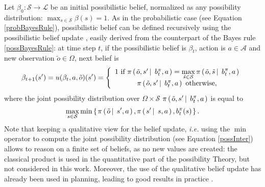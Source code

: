 {Let $\beta_0: \mathcal{S} \rightarrow \mathcal{L}$ be an initial possibilistic belief,
normalized as any possibility distribution: $\max_{s \in \mathcal{S}} \beta(s)=1$.
As in the probabilistic case (see Equation \ref{probBayesRule}), possibilistic belief can be defined recursively
using the possibilistic belief update \cite{Drougard13}, easily derived from the counterpart of the
Bayes rule \ref{possBayesRule}: at time step $t$, 
if the possibilistic belief is $\beta_t$, action is $a \in \mathcal{A}$ 
and new observation $\tilde{o} \in \Omega$, next belief is
\begin{eqnarray}
\label{possBelUpdate} \beta_{t+1}(s') = u(\beta_{t},a,\tilde{o})(s') =  \left \{ \begin{array}{ccc} 1 \mbox{ if } \pi \left( \left.  \tilde{o},s' \, \right| \left. \, b_t^{\pi}, a \right. \right) = \displaystyle \max_{\tilde{s} \in \mathcal{S}} \pi \left( \left.  \tilde{o}, \tilde{s} \, \right| \left. \, b_t^{\pi}, a \right. \right) \\
 \pi \left( \left.  \tilde{o}, s' \, \right| \left. \, b_t^{\pi}, a \right. \right) \mbox{ otherwise},
\end{array} \right.
\end{eqnarray}
where the joint possibility distribution over $\Omega \times \mathcal{S}$
$\pi \left( \left.  \tilde{o},s' \, \right| \left. \, b_t^{\pi}, a \right. \right)$ is equal to \[ \max_{s \in \mathcal{S}} \min \left\{ \left.  \pi \left( \left.  \tilde{o} \, \right| \left. \, s',a  \right. \right), \pi \left( \left.  s' \, \right| \left. \, s,a  \right. \right), b_t^{\pi}(s) \right. \right\}.\]
Note that keeping a qualitative view for the belief update,
\textit{i.e.} using the $\min$ operator 
to compute the joint possibility distribution (see Equation \ref{possInter})
allows to reason on a finite set of beliefs, as no new values are created:
the classical product is used in the quantitative part of the possibility Theory, 
but not considered in this work.
Moreover, the use of the qualitative belief update 
has already been used in planning, leading to good results
in practice \cite{DBLP:conf/aaai/DrougardTFD14}.
}
